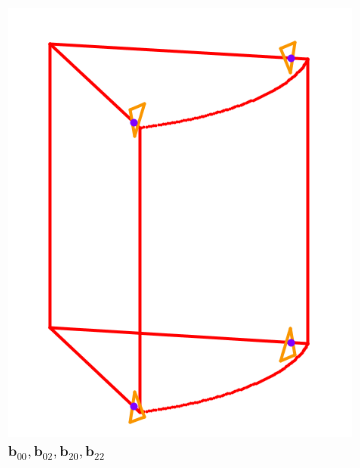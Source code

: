 \documentclass{Humantech_Paper_Awardfullpaper_hutech}
\begin{document}
\begin{figure}[h]
	\begin{center}
		\begin{subfigure}{.2\textwidth}
			\includegraphics[width=\textwidth]{approx1}
			\caption{$\mathbf{b}_{00}, \mathbf{b}_{02}, \mathbf{b}_{20}, \mathbf{b}_{22}$}
		\end{subfigure}
		\begin{subfigure}{.2\textwidth}

\end{subfigure}
\end{center}
\end{figure}
\end{document}
